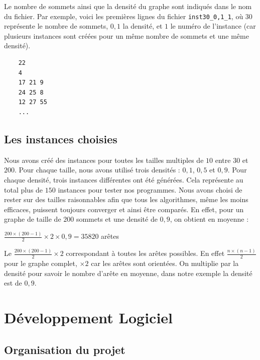 \documentclass[a4paper]{article}
\begin{document}
Le nombre de sommets ainsi que la densité du graphe sont indiqués dans le nom du fichier. Par exemple, voici les premières lignes du fichier \texttt{inst30\_0,1\_1}, où $30$ représente le nombre de sommets, $0{,}1$ la densité, et $1$ le numéro de l’instance (car plusieurs instances sont créées pour un même nombre de sommets et une même densité).
\begin{center}
\noindent
\begin{minipage}{0.6\linewidth}  %
\begin{lstlisting}
	22
	4
	17 21 9
	24 25 8
	12 27 55
	...
\end{lstlisting}
\end{minipage}
\end{center}

\subsection{Les instances choisies}

Nous avons créé des instances pour toutes les tailles multiples de $10$ entre $30$ et $200$. Pour chaque taille, nous avons utilisé trois densités : $0{,}1$, $0{,}5$ et $0{,}9$. Pour chaque densité, trois instances différentes ont été générées. Cela représente au total plus de $150$ instances pour tester nos programmes.
Nous avons choisi de rester sur des tailles raisonnables afin que tous les algorithmes, même les moins efficaces, puissent toujours converger et ainsi être comparés. En effet, pour un graphe de taille de $200$ sommets et une densité de $0{,}9$, on obtient en moyenne :

\begin{center}
$\frac{200 \times (200-1)}{2} \times 2 \times 0{,}9 = 35 820$ arêtes
\end{center}
Le $\frac{200 \times (200-1)}{2} \times 2$ correspondant à toutes les arêtes possibles. En effet $\frac{n \times (n-1)}{2}$ pour le graphe complet, $\times 2$ car les arêtes sont orientées. On multiplie par la densité pour savoir le nombre d'arête en moyenne, dans notre exemple la densité est de $0,9$.
\section{Développement Logiciel}

\subsection{Organisation du projet}
\end{document}
